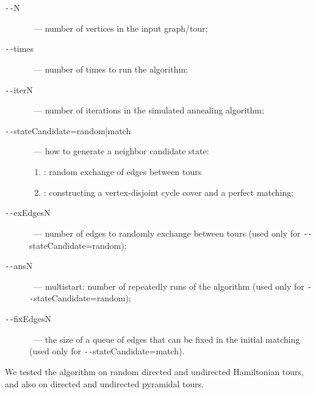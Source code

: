 \documentclass[runningheads]{llncs}
\begin{document}
\begin{description}
    \item [\texttt{-{}-}N]~--- number of vertices in the input graph/tour; %
    \item [\texttt{-{}-}times]~--- number of times to run the algorithm; %
    
    \item [\texttt{-{}-}iterN]~--- number of iterations in the simulated annealing algorithm; %
    
    \item [\texttt{-{}-}stateCandidate=random|match]~--- how to generate a neighbor candidate state: %
    \begin{enumerate}
        \item [\textit{random}]: random exchange of edges between tours %
        \item [\textit{match}]: constructing a vertex-disjoint cycle cover and a perfect matching; %
    \end{enumerate}
    
    \item [\texttt{-{}-}exEdgesN]~--- number of edges to randomly exchange between tours (used only for \texttt{-{}-}stateCandidate=random); %
    
    \item [\texttt{-{}-}ansN]~--- multistart: number of repeatedly runs of the algorithm (used only for \texttt{-{}-}stateCandidate=random); %
    
    \item [\texttt{-{}-}fixEdgesN]~--- the size of a queue of edges that can be fixed in the initial matching (used only for \texttt{-{}-}stateCandidate=match). %
\end{description}

We tested the algorithm on random directed and undirected Hamiltonian tours, and also on directed and undirected pyramidal tours.
\end{document}
